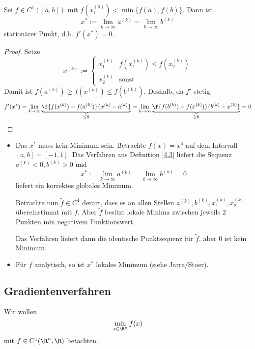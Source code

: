 \documentclass[11pt]{scrbook}
\begin{document}
\begin{st} \label{4.5}
	Sei $f\in C^1([a,b])$ mit $f(x_1^{(0)}) < \min\{f(a),f(b)\}$.
	Dann ist
	\[
		x^* := \lim_{k\to \infty} a^{(k)} = \lim_{k\to \infty}b^{(k)}
	\]
	stationärer Punkt, d.h. $f'(x^*) = 0$.
	\begin{proof}
		Setze 
		\[
			x^{(k)} := \begin{cases}
				x_1^{(k)} & f(x_1^{(k)}) \le f(x_2^{(k)}) \\
				x_2^{(k)} & \text{sonst}
			\end{cases}
		\]
		Damit ist $f(a^{(k)}) \ge f(x^{(k)}) \le f(b^{(k)})$.
		Deshalb, da $f'$ stetig:
		\[
			f'(x^*) = \lim_{k\to \infty} \underbrace{\f {f(x^{(k)})-f(a^{(k)})}{x^{(k)}-a^{(k)}}}_{\le 0} = \lim_{k\to \infty} \underbrace{\f {f(b^{(k)})-f(x^{(k)})}{b^{(k)}-x^{(k)}}}_{\ge 0} = 0
		\]
	\end{proof}
	\begin{note}

		\begin{itemize}
			\item
				Das $x^*$ muss kein Minimum sein.
				Betrachte $f(x) = x^4$ auf dem Intervall $[a,b] = [-1,1]$.
				Das Verfahren aus Definition \ref{4.3} liefert die Sequenz $a^{(k)} < 0, b^{(k)} > 0$ und
				\[
					x^* := \lim_{k\to \infty}a^{(k)} = \lim_{k\to \infty} b^{(k)} = 0
				\]
				liefert ein korrektes globales Minimum.

				Betrachte nun $\tilde f\in C^1$ derart, dass es an allen Stellen $a^{(k)},b^{(k)},x_1^{(k)},x_2^{(k)}$ übereinstimmt mit $f$.
				Aber $\tilde f$ besitzt lokale Minima zwischen jeweils $2$ Punkten min negativem Funktionswert.

				Das Verfahren liefert dann die identische Punktsequenz für $\tilde f$, aber $0$ ist kein Minimum.
			\item
				Für $f$ analytisch, so ist $x^*$ lokales Minimum (siehe Jarre/Stoer).
		\end{itemize}
	\end{note}
\end{st}


\subsection{Gradientenverfahren}

Wir wollen
\[
	\min_{x\in \R^n} f(x)
\]
mit $f \in C^1 (\R^n, \R)$ betachten.
\end{document}
